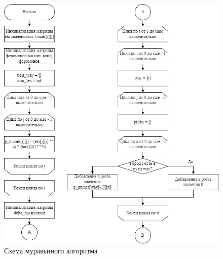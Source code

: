 \clearpage

\begin{figure}[h!btp]
	\centering
	\includegraphics[width=420pt]{inc/scheme_ant_alg.png}
	\caption{Схема муравьиного алгоритма}
	\label{fig:ant}	
\end{figure}

\clearpage

